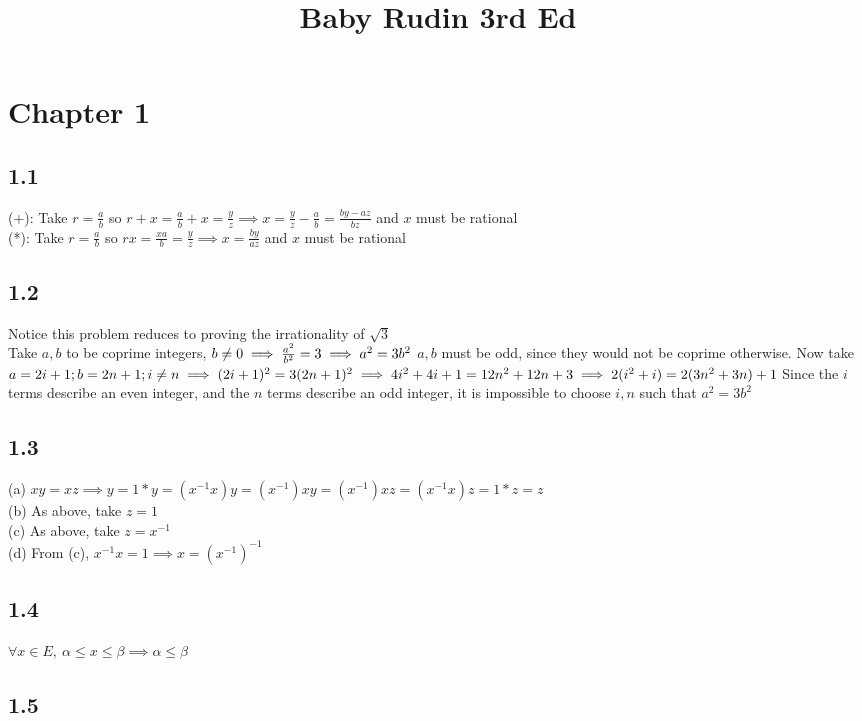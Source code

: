 \documentclass[11pt]{article}
\begin{document}
\title{Baby Rudin 3rd Ed}

\maketitle
\clearpage

\section*{Chapter 1}
	\subsection*{1.1}
		(+): Take $ r = \frac{a}{b}$ so $ r + x = \frac{a}{b} + x = \frac{y}{z} \implies x = \frac{y}{z} - \frac{a}{b} =  \frac{by - az}{bz}$ and $x$ must be rational\\
		(*): Take $r = \frac{a}{b}$ so $rx = \frac{xa}{b} = \frac{y}{z} \implies x = \frac{by}{az}$ and $x$ must be rational
	\subsection*{1.2}
		Notice this problem reduces to proving the irrationality of $\sqrt{3}$\\
		Take $a, b$ to be coprime integers, $b \centernot = 0 \implies \frac{a^2}{b^2}  = 3 \implies a^2 = 3b^2$  $a, b$ must be odd, since they would not be
		coprime otherwise.  Now take $a = 2i + 1; b = 2n + 1; i \centernot = n \implies (2i + 1)^2 = 3(2n + 1)^2 \implies 4i^2 + 4i + 1 = 12n^2 + 12n + 3 
		\implies 2(i^2 + i) = 2(3n^2 + 3n) + 1$  Since the $i$ terms describe an even integer, and the $n$ terms describe an odd integer, it is impossible to choose
		$i, n$ such that $a^2 = 3b^2$
	\subsection*{1.3}
		(a) $xy = xz \implies y = 1*y = (x^{-1}x)y = (x^{-1})xy = (x^{-1})xz = (x^{-1}x)z = 1*z = z$\\
		(b) As above, take $z = 1$\\
		(c) As above, take $z = x^{-1}$\\
		(d) From (c), $x^{-1}x = 1 \implies x = (x^{-1})^{-1}$
	\subsection*{1.4}
		$\forall x \in E,\  \alpha \leq x \leq \beta \implies \alpha \leq \beta$ 
	\subsection*{1.5}
\end{document}
